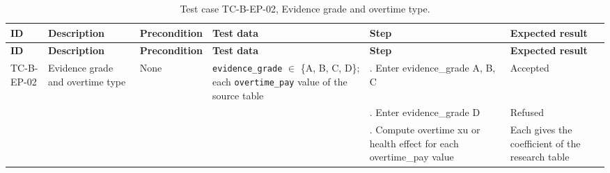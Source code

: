 {\footnotesize{}\renewcommand{\arraystretch}{1.1}
\begin{longtable}{|>{\raggedright\arraybackslash}p{}|>{\raggedright\arraybackslash}p{}|>{\raggedright\arraybackslash}p{}|>{\raggedright\arraybackslash}p{}|>{\raggedright\arraybackslash}p{}|>{\raggedright\arraybackslash}p{}|}
\caption{Test case TC-B-EP-02, Evidence grade and overtime type.} \\
\hline
\textbf{ID} & \textbf{Description} & \textbf{Precondition} & \textbf{Test data} & \textbf{Step} & \textbf{Expected result} \\ \hline
\endfirsthead
\hline
\textbf{ID} & \textbf{Description} & \textbf{Precondition} & \textbf{Test data} & \textbf{Step} & \textbf{Expected result} \\ \hline
\endhead
TC-B-EP-02 & Evidence grade and overtime type & None & \texttt{evidence\_\allowbreak{}grade} $\in$ \{A, B, C, D\}; each \texttt{overtime\_\allowbreak{}pay} value of the source table & 1. Enter evidence\_\allowbreak{}grade A, B, C & Accepted \\ \cline{5-6}
 &  &  &  & 2. Enter evidence\_\allowbreak{}grade D & Refused \\ \cline{5-6}
 &  &  &  & 3. Compute overtime xu or health effect for each overtime\_\allowbreak{}pay value & Each gives the coefficient of the research table \\ \hline
\end{longtable}
}

